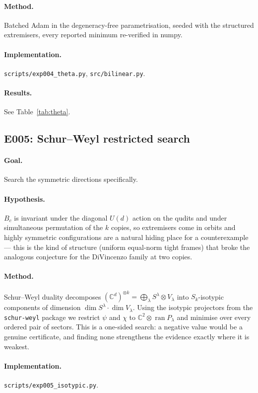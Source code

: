 \documentclass[11pt]{article}
\theoremstyle{definition}
\theoremstyle{plain}
\newcommand{\CC}{\mathbb{C}}
\begin{document}
\paragraph{Method.} Batched Adam in the degeneracy-free parametrisation, seeded with the
structured extremisers, every reported minimum re-verified in numpy.
\paragraph{Implementation.} \texttt{scripts/exp004\_theta.py}, \texttt{src/bilinear.py}.
\paragraph{Results.} See Table~\ref{tab:theta}.

\subsection*{E005: Schur--Weyl restricted search}
\label{sec:iso}
\paragraph{Goal.} Search the symmetric directions specifically.
\paragraph{Hypothesis.} $B_c$ is invariant under the diagonal $U(d)$ action on the qudits
and under simultaneous permutation of the $k$ copies, so extremisers come in orbits and
highly symmetric configurations are a natural hiding place for a counterexample --- this is
the kind of structure (uniform equal-norm tight frames) that broke the analogous
conjecture for the DiVincenzo family at two copies.
\paragraph{Method.} Schur--Weyl duality decomposes $(\CC^d)^{\otimes k}=\bigoplus_\lambda
S^\lambda\otimes V_\lambda$ into $S_k$-isotypic components of dimension
$\dim S^\lambda\cdot\dim V_\lambda$. Using the isotypic projectors from the
\texttt{schur-weyl} package we restrict $\psi$ and $\chi$ to
$\CC^2\otimes\operatorname{ran}P_{\lambda}$ and minimise over every ordered pair of sectors.
This is a one-sided search: a negative value would be a genuine certificate, and finding
none strengthens the evidence exactly where it is weakest.
\paragraph{Implementation.} \texttt{scripts/exp005\_isotypic.py}.
\end{document}
